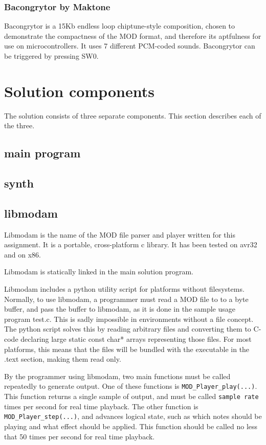 \subsubsection{Bacongrytor by Maktone}
Bacongrytor is a 15Kb endless loop chiptune-style composition, chosen to demonstrate the compactness of the MOD format, and therefore its aptfulness for use on microcontrollers.
It uses 7 different PCM-coded sounds.
Bacongrytor can be triggered by pressing SW0.


\section{Solution components}

The solution consists of three separate components. This section describes each of the three.

\subsection{main program}
\subsection{synth}

\subsection{libmodam}

Libmodam is the name of the MOD file parser and player written for this assignment.
It is a portable, cross-platform c library.
It has been tested on avr32 and on x86.

Libmodam is statically linked in the main solution program.

Libmodam includes a python utility script for platforms without filesystems.
Normally, to use libmodam, a programmer must read a MOD file to to a byte buffer, and pass the buffer to libmodam, as it is done in the sample usage program test.c.
This is sadly impossible in environments without a file concept.
The python script solves this by reading arbitrary files and converting them to C-code declaring large static const char* arrays representing those files.
For most platforms, this means that the files will be bundled with the executable in the .text section, making them read only.

By the programmer using libmodam, two main functions must be called repeatedly to generate output.
One of these functions is \texttt{MOD\_Player\_play(...)}.
This function returns a single sample of output, and must be called \texttt{sample rate} times per second for real time playback.
The other function is \texttt{MOD\_Player\_step(...)}, and advances logical state, such as which notes should be playing and what effect should be applied.
This function should be called no less that 50 times per second for real time playback.

